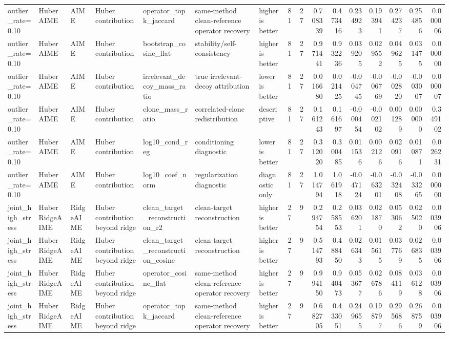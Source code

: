 \begin{table}[t]
\begin{tabular}{lllllllrrrrrrrrr}
outlier_rate=0.10 & HuberAIME & AIME & Huber contribution & operator_topk_jaccard & same-method clean-reference operator recovery & higher is better & 81 & 27 & 0.708339 & 0.473416 & 0.234923 & 0.193941 & 0.274237 & 0.254856 & 0.000006 \\
outlier_rate=0.10 & HuberAIME & AIME & Huber contribution & bootstrap_cosine_flat & stability/self-consistency & higher is better & 81 & 27 & 0.971441 & 0.932236 & 0.039205 & 0.029552 & 0.049625 & 0.031475 & 0.000000 \\
outlier_rate=0.10 & HuberAIME & AIME & Huber contribution & irrelevant_decoy_mass_ratio & true irrelevant-decoy attribution & lower is better & 81 & 27 & 0.016680 & 0.021425 & -0.004745 & -0.006769 & -0.002820 & -0.003007 & 0.000007 \\
outlier_rate=0.10 & HuberAIME & AIME & Huber contribution & clone_mass_ratio & correlated-clone redistribution & descriptive & 81 & 27 & 0.161243 & 0.161697 & -0.000454 & -0.002102 & 0.001289 & 0.000000 & 0.349102 \\
outlier_rate=0.10 & HuberAIME & AIME & Huber contribution & log10_cond_reg & conditioning diagnostic & lower is better & 81 & 27 & 0.312020 & 0.300485 & 0.011536 & 0.002126 & 0.020916 & 0.010871 & 0.026231 \\
outlier_rate=0.10 & HuberAIME & AIME & Huber contribution & log10_coef_norm & regularization diagnostic & diagnostic only & 81 & 27 & 1.014794 & 1.061918 & -0.047124 & -0.063201 & -0.032408 & -0.033265 & 0.000000 \\
joint_high_stress & HuberRidgeAIME & RidgeAIME & Huber contribution beyond ridge & clean_target_reconstruction_r2 & clean-target reconstruction & higher is better & 27 & 9 & 0.294754 & 0.258553 & 0.036201 & 0.021870 & 0.053062 & 0.025020 & 0.003906 \\
joint_high_stress & HuberRidgeAIME & RidgeAIME & Huber contribution beyond ridge & clean_target_reconstruction_cosine & clean-target reconstruction & higher is better & 27 & 9 & 0.514793 & 0.488450 & 0.026343 & 0.015615 & 0.037769 & 0.026835 & 0.003906 \\
joint_high_stress & HuberRidgeAIME & RidgeAIME & Huber contribution beyond ridge & operator_cosine_flat & same-method clean-reference operator recovery & higher is better & 27 & 9 & 0.994150 & 0.940473 & 0.053677 & 0.026786 & 0.084119 & 0.036128 & 0.003906 \\
joint_high_stress & HuberRidgeAIME & RidgeAIME & Huber contribution beyond ridge & operator_topk_jaccard & same-method clean-reference operator recovery & higher is better & 27 & 9 & 0.682705 & 0.433051 & 0.249655 & 0.198797 & 0.295686 & 0.268759 & 0.003906 \\

\end{tabular}
\end{table}

